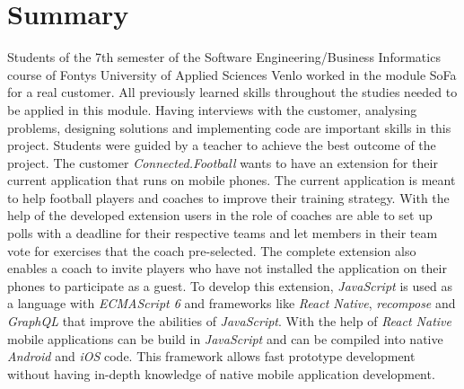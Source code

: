 \section*{Summary}

Students of the 7th semester of the Software Engineering/Business Informatics course of Fontys University of Applied Sciences Venlo worked in the module SoFa for a real customer. All previously learned skills throughout the studies needed to be applied in this module. Having interviews with the customer, analysing problems, designing solutions and implementing code are important skills in this project. Students were guided by a teacher to achieve the best outcome of the project. 
\newline
The customer \textit{Connected.Football} wants to have an extension for their current application that runs on mobile phones. The current application is meant to help football players and coaches to improve their training strategy. With the help of the developed extension users in the role of coaches are able to set up polls with a deadline for their respective teams and let members in their team vote for exercises that the coach pre-selected. The complete extension also enables a coach to invite players who have not installed the application on their phones to participate as a guest.
\newline
To develop this extension, \textit{JavaScript} is used as a language with \textit{ECMAScript 6} and frameworks like \textit{React Native}, \textit{recompose} and \textit{GraphQL} that improve the abilities of \textit{JavaScript}. With the help of \textit{React Native} mobile applications can be build in \textit{JavaScript} and can be compiled into native \textit{Android} and \textit{iOS} code. This framework allows fast prototype development without having in-depth knowledge of native mobile application development.